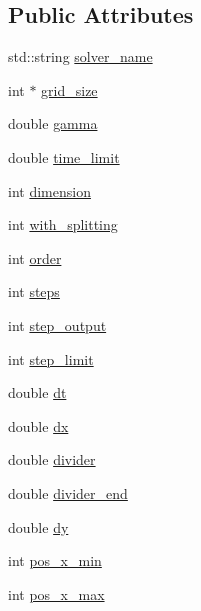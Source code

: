 \subsection*{Public Attributes}
\begin{DoxyCompactItemize}
\item 
std\-::string \hyperlink{classNumerical__Method_a4292dc8b238e8377cf35df477628f45f}{solver\-\_\-name}
\item 
int $\ast$ \hyperlink{classNumerical__Method_a916bdb33da9738c2d387b46a37b89ddc}{grid\-\_\-size}
\item 
double \hyperlink{classNumerical__Method_a03221980e39158a3116b00d777a86606}{gamma}
\item 
double \hyperlink{classNumerical__Method_a2edf6c77c3d30d1250e0410de12f5cc5}{time\-\_\-limit}
\item 
int \hyperlink{classNumerical__Method_ae867f42bb0ab0d0bdfdc7d8301c3f45f}{dimension}
\item 
int \hyperlink{classNumerical__Method_a1a565e278873462880e6abb92660c3cb}{with\-\_\-splitting}
\item 
int \hyperlink{classNumerical__Method_a711b3c69b3bd338fd8c2ee5c4396ba7b}{order}
\item 
int \hyperlink{classNumerical__Method_ad61abc8035cbd22e32903af1282cb610}{steps}
\item 
int \hyperlink{classNumerical__Method_acc1d72ff59613cb41b3fb4b4bd47f176}{step\-\_\-output}
\item 
int \hyperlink{classNumerical__Method_a21a906effd1727e5c82b884712ef8ef4}{step\-\_\-limit}
\item 
double \hyperlink{classNumerical__Method_a7eae91e02cf957aa4b702ebba91ce859}{dt}
\item 
double \hyperlink{classNumerical__Method_a3787608790a9dbe0dd9d4d27aafa6008}{dx}
\item 
double \hyperlink{classNumerical__Method_a9767068bb9f5f20c83567f6c9c2ba314}{divider}
\item 
double \hyperlink{classNumerical__Method_a914fcf77b93b98de47e5535dde982f6b}{divider\-\_\-end}
\item 
double \hyperlink{classNumerical__Method_a531122199f55330a4fff143fdae3198d}{dy}
\item 
int \hyperlink{classNumerical__Method_a225e6d56e3b3fac30631bc97d65250da}{pos\-\_\-x\-\_\-min}
\item 
int \hyperlink{classNumerical__Method_a3d5c5f4b1c31e8b12569cc7bef0710ef}{pos\-\_\-x\-\_\-max}
\item 

\end{DoxyCompactItemize}
